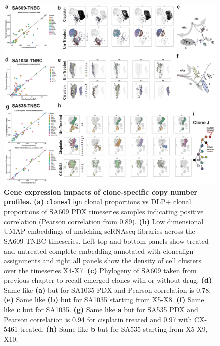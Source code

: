\begin{figure}
\centering
\includegraphics[width=\textwidth]{Figures/chap5/fig2_clonealignembeddings.png}
	
\caption[Gene expression impacts of clone-specific copy number profiles]
	{\small
	\textbf{Gene expression impacts of clone-specific copy number profiles.}
	   \textbf{(a)} \texttt{clonealign} clonal proportions vs DLP+ clonal proportions of SA609 PDX timeseries samples indicating positive correlation (Pearson correlation from 0.89).
	    \textbf{(b)} Low dimensional \ac{UMAP} embeddings of matching scRNAseq libraries across the SA609 TNBC timeseries. Left top and bottom panels show treated and untreated complete embedding annotated with clonealign assignments and right all panels show the density of cell clusters over the timeseries X4-X7.
	     \textbf{(c)} Phylogeny of SA609 taken from previous chapter to recall emerged clones with or without drug. 
	     \textbf{(d)} Same like \textbf{(a)} but for SA1035 PDX and Pearson correlation is 0.78. \textbf{(e)} Same like \textbf{(b)} but for SA1035 starting from X5-X8. \textbf{(f)} Same like \textbf{c} but for SA1035. \textbf{(g)} Same like \textbf{a} but for SA535 PDX and Pearson correlation is 0.94 for cisplatin treated and 0.97 with CX-5461 treated. \textbf{(h)} Same like \textbf{b} but for SA535 starting from X5-X9, X10.
	}
	\label{fig:fig2_clonealignembeddings.pdf}
\end{figure}

